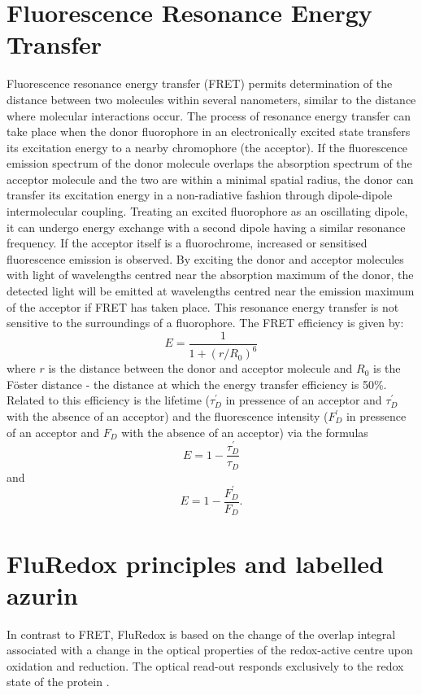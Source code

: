 \documentclass[twoside,single]{lion-msc}
\begin{document}
\section{Fluorescence Resonance Energy Transfer}
Fluorescence resonance energy transfer (FRET) permits determination of the distance between two molecules within several nanometers, similar to the distance where molecular interactions occur. The process of resonance energy transfer can take place when the donor fluorophore in an electronically excited state transfers its excitation energy to a nearby chromophore (the acceptor). If the fluorescence emission spectrum of the donor molecule overlaps the absorption spectrum of the acceptor molecule and the two are within a minimal spatial radius, the donor can transfer its excitation energy in a non-radiative fashion through dipole-dipole intermolecular coupling. Treating an excited fluorophore as an oscillating dipole, it can undergo energy exchange with a second dipole having a similar resonance frequency. If the acceptor itself is a fluorochrome, increased or sensitised fluorescence emission is observed. By exciting the donor and acceptor molecules with light of wavelengths centred near the absorption maximum of the donor, the detected light will be emitted at wavelengths centred near the emission maximum of the acceptor if FRET has taken place. This resonance energy transfer is not sensitive to the surroundings of a fluorophore. The FRET efficiency is given by:
\begin{equation}
E = \frac{1}{1 + (r/R_{0})^{6}}
\end{equation}
where $r$ is the distance between the donor and acceptor molecule and $R_{0}$ is the F\"oster distance - the distance at which the energy transfer efficiency is 50\%. Related to this efficiency is the lifetime ($\tau_{D}^{'}$ in pressence of an acceptor and $\tau_{D}^{'}$ with the absence of an acceptor) and the fluorescence intensity ($F_{D}^{'}$ in pressence of an acceptor and $F_{D}$ with the absence of an acceptor) via the formulas
\begin{equation}
E = 1 - \frac{\tau_{D}^{'}}{\tau_{D}}
\end{equation}
and
\begin{equation}
E = 1 - \frac{F_{D}^{'}}{F_{D}}.
\end{equation}


\section{FluRedox principles and labelled azurin}
In contrast to FRET, FluRedox is based on the change of the overlap integral associated with a change in the optical properties of the redox-active centre upon oxidation and reduction. The optical read-out responds exclusively to the redox state of the protein \cite{Akklc}. 
\end{document}
